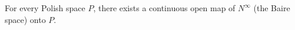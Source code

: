 For every Polish space $P$, there exists a continuous open map of $N^\infty$ (the Baire space) onto $P$.
